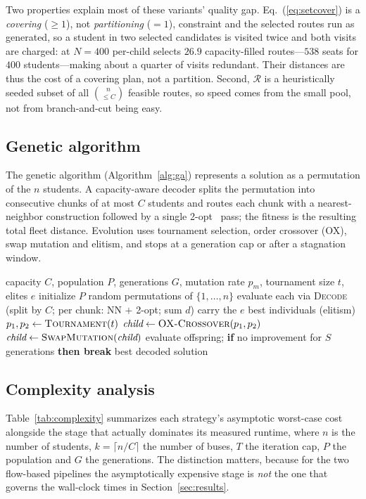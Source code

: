 \documentclass[runningheads]{llncs}
\begin{document}
Two properties explain most of these variants' quality gap.
Eq.~(\ref{eq:setcover}) is a \emph{covering} ($\ge1$), not
\emph{partitioning} ($=1$), constraint and the selected routes run as
generated, so a student in two selected candidates is visited twice and
both visits are charged: at $N=400$ per-child selects $26.9$
capacity-filled routes---$538$ seats for $400$ students---making about a
quarter of visits redundant. Their distances are thus the cost of a
covering plan, not a partition. Second, $\mathcal{R}$ is a heuristically
seeded subset of all $\binom{n}{\le C}$ feasible routes, so speed comes
from the small pool, not from branch-and-cut being easy.

\subsection{Genetic algorithm}
The genetic algorithm (Algorithm~\ref{alg:ga}) represents a solution as
a permutation of the $n$ students. A capacity-aware decoder splits the
permutation into consecutive chunks of at most $C$ students and routes
each chunk with a nearest-neighbor construction followed by a single
2-opt~\cite{Croes1958TwoOpt} pass; the fitness is the resulting total
fleet distance. Evolution uses tournament selection, order crossover
(OX), swap mutation and elitism, and stops at a generation cap or after
a stagnation window.

\begin{algorithm}[t]
\caption{Genetic algorithm with capacity-aware decoder}
\label{alg:ga}
\footnotesize
\begin{algorithmic}[1]
\Require capacity $C$, population $P$, generations $G$, mutation rate
$p_m$, tournament size $t$, elites $e$
\State initialize $P$ random permutations of $\{1,\dots,n\}$
\State evaluate each via \textsc{Decode} (split by $C$; per chunk: NN $+$ 2-opt; sum $d$)
  \State carry the $e$ best individuals (elitism)
    \State $p_1,p_2 \gets \textsc{Tournament}(t)$
    \State $\textit{child} \gets \textsc{OX-Crossover}(p_1,p_2)$
     $\textit{child}\gets\textsc{SwapMutation}(\textit{child})$ \EndIf
  \EndWhile
  \State evaluate offspring; \textbf{if} no improvement for $S$ generations \textbf{then break}
\EndFor
\State \Return best decoded solution
\end{algorithmic}
\end{algorithm}

\subsection{Complexity analysis}\label{sec:complexity}
Table~\ref{tab:complexity} summarizes each strategy's asymptotic
worst-case cost alongside the stage that actually dominates its measured
runtime, where $n$ is the number of students, $k=\lceil n/C\rceil$ the
number of buses, $T$ the iteration cap, $P$ the population and $G$ the
generations. The distinction matters, because for the two flow-based
pipelines the asymptotically expensive stage is \emph{not} the one that
governs the wall-clock times in Section~\ref{sec:results}.
\end{document}
